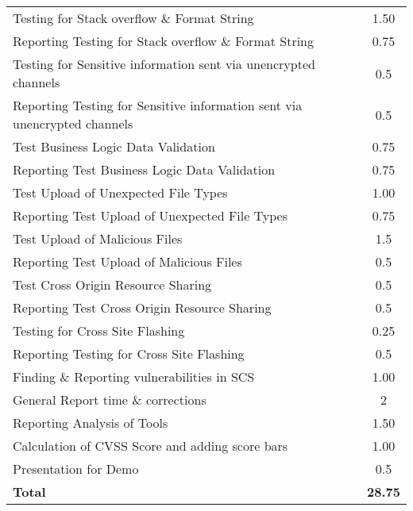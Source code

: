 \begin{table}[H]
\begin{tabular*}{\textwidth}{@{\extracolsep{\fill}} l c@{\extracolsep{0pt}} }
Testing for Stack overflow \& Format String & 1.50 \\
Reporting Testing for Stack overflow \& Format String & 0.75 \\
Testing for Sensitive information sent via unencrypted channels & 0.5 \\
Reporting Testing for Sensitive information sent via unencrypted channels & 0.5 \\
Test Business Logic Data Validation         & 0.75 \\
Reporting Test Business Logic Data Validation & 0.75 \\
Test Upload of Unexpected File Types        & 1.00 \\
Reporting Test Upload of Unexpected File Types & 0.75 \\
Test Upload of Malicious Files              & 1.5 \\
Reporting Test Upload of Malicious Files    & 0.5 \\
Test Cross Origin Resource Sharing          & 0.5 \\
Reporting Test Cross Origin Resource Sharing & 0.5 \\
Testing for Cross Site Flashing             & 0.25 \\
Reporting Testing for Cross Site Flashing   & 0.5 \\
Finding \& Reporting vulnerabilities in SCS & 1.00 \\
General Report time \& corrections			& 2 \\
Reporting Analysis of Tools                 & 1.50 \\
Calculation of CVSS Score and adding score bars	& 1.00 \\
Presentation for Demo						& 0.5 \\
\hline\hline
\textbf{Total}								& \textbf{28.75}
\end{tabular*}
\end{table}
\clearpage

